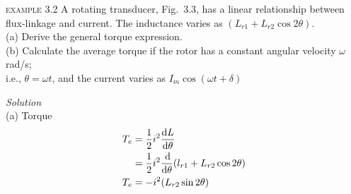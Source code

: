 \documentclass[a4paper,numbers=noenddot,12pt]{scrbook}
\begin{document}
            \noindent \textsc{example} 3.2 A rotating transducer, Fig.\ 3.3, has a linear relationship between flux-linkage and current. The inductance varies as $(L_{r1} + L_{r2} \cos 2 \theta)$.\\
            (a) Derive the general torque expression.\\
            (b) Calculate the average torque if the rotor has a constant angular velocity $\omega$ rad/s;\\
            i.e., \hspace{10pt} $\theta = \omega t$, and the current varies as $I_m \cos (\omega t + \delta)$

            \noindent\textit{Solution} \\ 
            (a) Torque
            \begin{align}
                T_e & = \dfrac{1}{2} i^2 \dfrac{\dif L}{\dif \theta} \nonumber \\
                & = \dfrac{1}{2} i^2 \dfrac{\dif}{\dif \theta} (l_{r1} + L_{r2} \cos 2 \theta) \nonumber \\
                T_e & = - i^2(L_{r2} \sin2\theta)
                \label{eq:Eq3.43}
            \end{align}
\end{document}
